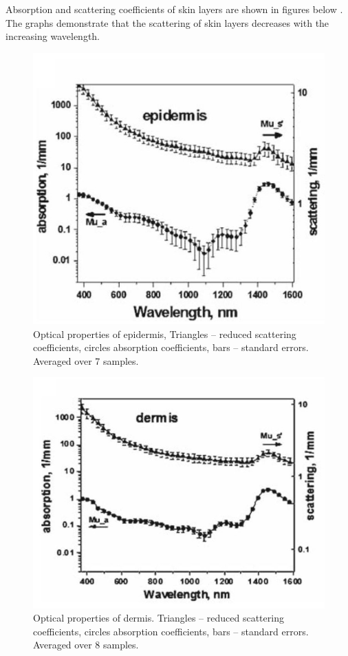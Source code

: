 Absorption and scattering coefficients of skin layers are shown in figures below \parencite{skin1}. The graphs demonstrate that the scattering of skin layers decreases with the increasing wavelength. 


\begin{figure}[H]
\centering
\includegraphics[scale=0.5]{figures/epidermis.JPG}
\captionsetup{justification=centering}
\caption[Optical properties of epidermis]{Optical properties of epidermis, Triangles – reduced scattering coefficients, circles absorption coefficients, bars – standard errors. Averaged over 7 samples.}\label{fig:epidermis}
\end{figure}





\begin{figure}[H]
\centering
\includegraphics[scale=0.5]{figures/dermis.JPG}
\captionsetup{justification=centering}
\caption[Optical properties of dermis]{Optical properties of dermis. Triangles – reduced scattering coefficients,  circles absorption coefficients, bars – standard errors. Averaged over 8 samples.}\label{fig:dermis}
\end{figure}


